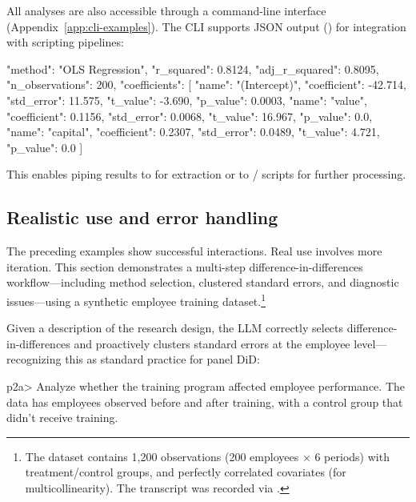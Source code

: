 \noindent All analyses are also accessible through a command-line interface
(Appendix~\ref{app:cli-examples}). The CLI supports JSON output
() for integration with scripting pipelines:


\begin{Soutput}
{
  "method": "OLS Regression",
  "r_squared": 0.8124,
  "adj_r_squared": 0.8095,
  "n_observations": 200,
  "coefficients": [
    {"name": "(Intercept)", "coefficient": -42.714,
     "std_error": 11.575, "t_value": -3.690, "p_value": 0.0003},
    {"name": "value", "coefficient": 0.1156,
     "std_error": 0.0068, "t_value": 16.967, "p_value": 0.0},
    {"name": "capital", "coefficient": 0.2307,
     "std_error": 0.0489, "t_value": 4.721, "p_value": 0.0}
  ]
}
\end{Soutput}

\noindent This enables piping results to  for extraction or to
/ scripts for further processing.

\subsection{Realistic use and error handling} \label{sec:examples-realistic}

The preceding examples show successful interactions. Real use involves
more iteration. This section demonstrates a multi-step
difference-in-differences workflow---including method selection,
clustered standard errors, and diagnostic issues---using a synthetic
employee training dataset.\footnote{The dataset contains 1,200
observations (200 employees $\times$ 6 periods) with treatment/control
groups, and perfectly correlated covariates (for multicollinearity).
The transcript was recorded via
.}

Given a description of the research design, the LLM correctly selects
difference-in-differences and proactively clusters standard errors at the
employee level---recognizing this as standard practice for panel DiD:

\begin{Sinput}
p2a> Analyze whether the training program affected employee performance.
     The data has employees observed before and after training, with a
     control group that didn't receive training.
\end{Sinput}

